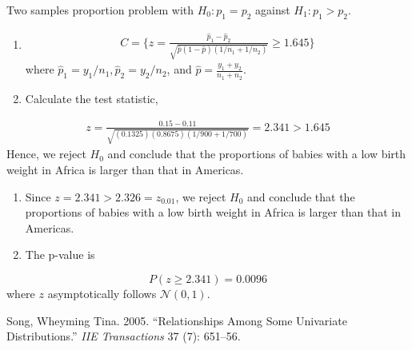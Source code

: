 \documentclass[
]{book}
\newlength{\cslhangindent}
\newenvironment{cslreferences}%
  {\setlength{\parindent}{0pt}%
  \everypar{\setlength{\hangindent}{\cslhangindent}}\ignorespaces}%
  {\par}
\theoremstyle{definition}
\theoremstyle{definition}
\theoremstyle{definition}
\theoremstyle{remark}
\begin{document}
Two samples proportion problem with \(H_0:p_1=p_2\) against \(H_1:p_1>p_2\).

\begin{enumerate}
\def\labelenumi{\arabic{enumi}.}
\item
  \begin{align}
  C=\{z=\frac{\hat{p}_{1}-\hat{p}_{2}}{\sqrt{\hat{p}(1-\hat{p})\left(1 / n_{1}+1 / n_{2}\right)}} \geq 1.645\}
  \end{align}
  where \(\hat p_1 = y_1/n_1,\hat p_2 = y_2/n_2\), and \(\hat p = \frac{y_1+y_2}{n_1+n_2}\).
\item
  Calculate the test statistic,
\end{enumerate}

\begin{align}
z=\frac{0.15-0.11}{\sqrt{(0.1325)(0.8675)(1 / 900+1 / 700)}}=2.341>1.645
\end{align}
Hence, we reject \(H_0\) and conclude that the proportions of babies with a low birth weight in Africa is larger than that in Americas.

\begin{enumerate}
\def\labelenumi{\arabic{enumi}.}
\setcounter{enumi}{2}
\item
  Since \(z=2.341>2.326=z_{0.01}\), we reject \(H_0\) and conclude that the proportions of babies with a low birth weight in Africa is larger than that in Americas.
\item
  The p-value is
\end{enumerate}

\begin{equation}
P(z \geq 2.341)=0.0096
\end{equation}
where \(z\) asymptotically follows \(\mathcal{N}(0,1)\).

\hypertarget{refs}{}
\begin{cslreferences}
\leavevmode\hypertarget{ref-song2005relationships}{}%
Song, Wheyming Tina. 2005. ``Relationships Among Some Univariate Distributions.'' \emph{IIE Transactions} 37 (7): 651--56.
\end{cslreferences}
\end{document}
